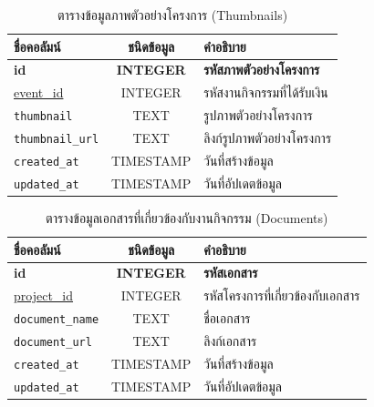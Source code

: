 \begin{table}[h]
    \centering
    \begin{tabular}{|l|c|l|}
        \hline
        ชื่อคอลัมน์               & ชนิดข้อมูล          & คำอธิบาย                       \\ \hline
        \textbf{id}           & \textbf{INTEGER} & \textbf{รหัสภาพตัวอย่างโครงการ} \\ \hline
        \underline{event\_id} & INTEGER          & รหัสงานกิจกรรมที่ได้รับเงิน         \\ \hline
        \verb |thumbnail|     & TEXT             & รูปภาพตัวอย่างโครงการ           \\ \hline
        \verb |thumbnail_url| & TEXT             & ลิงก์รูปภาพตัวอย่างโครงการ        \\ \hline
        \verb |created_at|    & TIMESTAMP        & วันที่สร้างข้อมูล                  \\ \hline
        \verb |updated_at|    & TIMESTAMP        & วันที่อัปเดตข้อมูล                 \\ \hline
    \end{tabular}
    \caption{ตารางข้อมูลภาพตัวอย่างโครงการ (Thumbnails)}
    \label{tab:thumbnail_data}
\end{table}

\begin{table}[h]
    \centering
    \begin{tabular}{|l|c|l|}
        \hline
        ชื่อคอลัมน์                 & ชนิดข้อมูล          & คำอธิบาย                     \\ \hline
        \textbf{id}             & \textbf{INTEGER} & \textbf{รหัสเอกสาร}         \\ \hline
        \underline{project\_id} & INTEGER          & รหัสโครงการที่เกี่ยวข้องกับเอกสาร \\ \hline
        \verb |document_name|   & TEXT             & ชื่อเอกสาร                   \\ \hline
        \verb |document_url|    & TEXT             & ลิงก์เอกสาร                  \\ \hline
        \verb |created_at|      & TIMESTAMP        & วันที่สร้างข้อมูล                \\ \hline
        \verb |updated_at|      & TIMESTAMP        & วันที่อัปเดตข้อมูล               \\ \hline
    \end{tabular}
    \caption{ตารางข้อมูลเอกสารที่เกี่ยวข้องกับงานกิจกรรม (Documents)}
    \label{tab:document_data}
\end{table}


